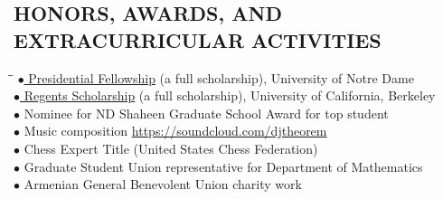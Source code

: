 \documentclass{resume}
\begin{document}
\begin{resume}
    \section{HONORS, AWARDS, AND EXTRACURRICULAR ACTIVITIES} 
    \vspace{-0.1in}
    \begin{tabbing}
        \hspace{2.3in}\= \hspace{2.6in}\= \kill
        \href{http://graduateschool.nd.edu/admissions/financial-support/prestigious-fellowships/presidential-fellowships-arthur-j-schmitt-fellowships/}{$\bullet$ Presidential
        Fellowship} (a full scholarship), University of Notre Dame  \\
        \href{http://students.berkeley.edu/finaid/undergraduates/types_regents.htm}{$\bullet$ Regents
        Scholarship} (a full scholarship), University of California, 
        Berkeley  \\
        $\bullet$ Nominee for ND Shaheen Graduate School Award for top student
        \\
        $\bullet$ Music composition
        \href{https://soundcloud.com/djtheorem}{https://soundcloud.com/djtheorem}
        \\
        $\bullet$ Chess Expert Title (United States Chess Federation) 
        \\
        $\bullet$ Graduate Student Union representative for Department of Mathematics \\
        $\bullet$ Armenian General Benevolent Union charity work \\
    \end{tabbing}

\end{resume}
\end{document}
